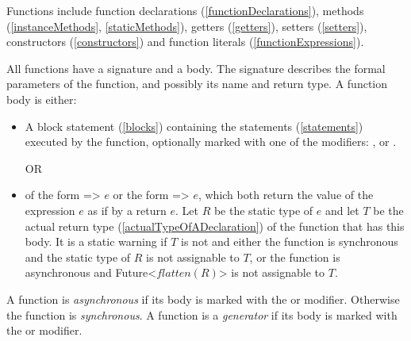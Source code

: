 \documentclass{article}
\newcommand{\code}[1]{{\sf #1}}
\begin{document}
\LMHash{}
Functions include  function declarations (\ref{functionDeclarations}), methods (\ref{instanceMethods},  \ref{staticMethods}), getters  (\ref{getters}), setters  (\ref{setters}), constructors  (\ref{constructors}) and function literals  (\ref{functionExpressions}).

\LMHash{}
All functions have a signature and a body. The signature describes the formal parameters of the function, and possibly its name and return type.  A function body is either:
\begin{itemize}
\item A block statement (\ref{blocks}) containing the statements (\ref{statements}) executed by the function, optionally marked with one of the modifiers: \ASYNC, \ASYNC* or \SYNC*.


OR
\item of the form \code{=> $e$} or the form \code{\ASYNC{} => $e$}, which both return the value of the expression $e$ as if by a \code{return $e$}. 
Let $R$ be the static type of $e$
and let $T$ be the actual return type (\ref{actualTypeOfADeclaration})
of the function that has this body.
It is a static warning if $T$ is not \VOID{} and either
the function is synchronous and the static type of $R$ is not assignable to $T$,
or the function is asynchronous and \code{Future<$flatten(R)$>}
is not assignable to $T$.

\end{itemize}

\LMHash{}
A function is {\em asynchronous} if its body is marked with the \ASYNC{} or \ASYNC* modifier. Otherwise the function is {\em synchronous}. A function is a {\em generator} if its body is marked with the \SYNC* or \ASYNC* modifier.

\end{document}
